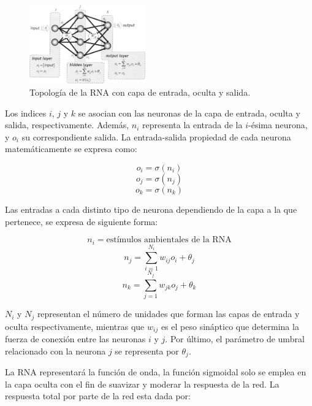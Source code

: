 \begin{figure}[H]
	\centering
	\includegraphics[width=5cm]{img/percep.jpg}
	\caption{Topolog\'ia de la RNA con capa de entrada, oculta y salida.}
	\label{fig:percep}
\end{figure}

Los indices $i$, $j$ y $k$ se asocian con las neuronas de la capa
de entrada, oculta y salida, respectivamente. Adem\'as, $n_i$ representa
la entrada de la $i$-\'esima neurona, y $o_i$ su correspondiente
salida. La entrada-salida propiedad de cada neurona
matem\'aticamente se expresa como: 

\begin{equation}
	o_i=\sigma(n_i)
	\label{entrada}
\end{equation}
\begin{equation}
	o_j=\sigma(n_j)
	\label{oculta}
\end{equation}
\begin{equation}
	o_k=\sigma(n_k)
	\label{salida}
\end{equation}

Las entradas a cada distinto tipo de neurona dependiendo
de la capa a la que pertenece, se expresa de siguiente forma:

\begin{equation}
	n_i=\text{est\'imulos ambientales de la RNA} \label{estimulo}
\end{equation}
\begin{equation}
	n_j=\sum^{N_i}_{i=1}w_{ij}o_i+\theta_j
\end{equation}
\begin{equation}
	n_k=\sum^{N_j}_{j=1}w_{jk}o_j+\theta_k
\end{equation}

$N_i$ y $N_j$ representan el n\'umero de unidades que forman
las capas de entrada y oculta respectivamente, mientras que
$w_{ij}$ es el peso sin\'aptico que determina la fuerza de conexi\'on
entre las neuronas $i$ y $j$. Por \'ultimo, el par\'ametro de umbral
relacionado con la neurona $j$ se representa por $\theta_j$.

La RNA representar\'a la funci\'on de onda, la funci\'on sigmoidal
solo se emplea en la capa oculta con el fin de suavizar
y moderar la respuesta de la red. La respuesta total por parte
de la red esta dada por:

